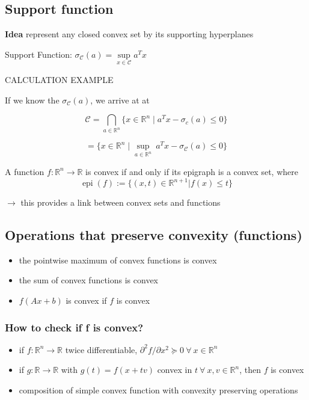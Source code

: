 \subsection{Support function}

\textbf{Idea} represent any closed convex set by its supporting hyperplanes

Support Function: $\sigma_\mathcal{C}(a) = \underset{x \in
\mathcal{C}}{\operatorname{sup}}a^Tx$

CALCULATION EXAMPLE

If we know the $\sigma_\mathcal{C}(a)$, we arrive at at

$$  \mathcal{C} = \bigcap_{a \in \mathbb{R}^n} \{x \in \mathbb{R}^n
\mid a^T x - \sigma_c(a) \leq 0\}$$

$$   = \{x \in \mathbb{R}^n \mid \underset{a \in
\mathbb{R}^{n}}{\operatorname{sup}}\ a^T x - \sigma_\mathcal{C}(a) \le 0\}$$

\begin{definition}
A function $f : \mathbb{R}^n \rightarrow \mathbb{R}$
is convex if and only if its epigraph is a convex set, where
$$\operatorname{epi}(f):=\{(x,t)\in \mathbb{R}^{n+1} | f(x) \le t \}$$
\end{definition}


$\rightarrow$ this provides a link between convex sets and functions

\subsection{Operations that preserve convexity (functions)}

\begin{itemize}
\item the pointwise maximum of convex functions is convex
\item the sum of convex functions is convex
\item $f(Ax+b)$ is convex if $f$ is convex
\end{itemize}

\subsubsection{How to check if f is convex?}

\begin{itemize}
\item if $f: \mathbb{R}^n \rightarrow \mathbb{R}$ twice differentiable,
$\partial^2f/\partial x^2 \succeq 0\ \forall\ x \in \mathbb{R}^{n}$

\item if $g: \mathbb{R} \rightarrow \mathbb{R}$ with $g(t)=f(x+tv)$
convex in $t\ \forall\ x,v \in \mathbb{R}^{n}$,
then $f$ is convex
\item composition of simple convex function with convexity preserving operations
\end{itemize}


